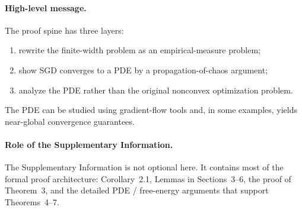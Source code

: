 \paragraph{High-level message.}
The proof spine has three layers:
\begin{enumerate}[label=\arabic*.]
\item rewrite the finite-width problem as an empirical-measure problem;
\item show SGD converges to a PDE by a propagation-of-chaos argument;
\item analyze the PDE rather than the original nonconvex optimization problem.
\end{enumerate}
The PDE can be studied using gradient-flow tools and, in some examples, yields near-global convergence guarantees.

\paragraph{Role of the Supplementary Information.}
The Supplementary Information is not optional here. It contains most of the formal proof architecture: Corollary~2.1, Lemmas in Sections~3--6, the proof of Theorem~3, and the detailed PDE / free-energy arguments that support Theorems~4--7.
